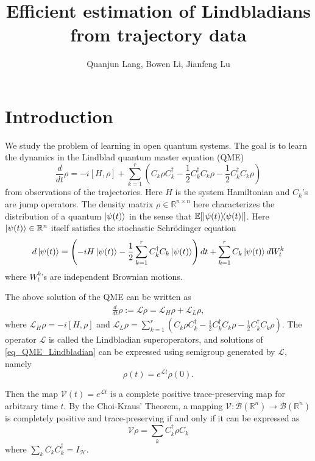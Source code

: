 \documentclass[10pt]{article}  %
\title{Efficient estimation of Lindbladians from trajectory data}
\author{Quanjun Lang, Bowen Li, Jianfeng Lu}
\date{}
\theoremstyle{plain}
\numberwithin{equation}{section}
\def\mH{\mathcal{H}}
\def\mL{\mathcal{L}}
\def\mV{\mathcal{V}}
\def\mB{\mathcal{B}}
\def\R{\mathbb{R}}
\begin{document}
\maketitle

\tableofcontents
\section{Introduction}

We study the problem of learning in open quantum systems. The goal is to learn the dynamics in the Lindblad quantum master equation (QME)
\begin{equation}\label{eq_QME_main}
	\frac{d}{dt} \rho = -i[H, \rho] + \sum_{k = 1}^r (C_k \rho C_k^\dagger - \frac{1}{2} C_k^\dagger C_k \rho - \frac{1}{2} C_k^\dagger C_k \rho)
\end{equation}
from observations of the trajectories. Here $H$ is the system Hamiltonian and $C_k$'s are jump operators. The density matrix $\rho \in \R^{n \times n}$ here characterizes the distribution of a quantum $\ket{\psi(t)}$ in the sense that $\mathbb{E}[\ketbra{\psi(t)}{\psi(t)}]$. 
Here $\ket{\psi(t)} \in \R^n$ itself satisfies the stochastic Schr\"{o}dinger equation
\begin{equation}
	d \ket{\psi(t)} = \left( -i H \ket{\psi(t)} - \frac{1}{2}\sum_{k = 1}^r C_k^\dagger C_k \ket{\psi(t)}\right) dt + \sum_{k = 1}^r C_k \ket{\psi(t)} dW^k_t
\end{equation}
where $W^k_t$'s are independent Brownian motions.


The above solution of the QME can be written as
\begin{align}\label{eq_QME_Lindbladian}
	\frac{d}{dt} \rho := \mL \rho =  \mL_H\rho + \mL_L \rho, 
\end{align}
where $\mL_H \rho = -i[H, \rho]$ and $\mL_L \rho = \sum_{k = 1}^r (C_k \rho C_k^\dagger - \frac{1}{2} C_k^\dagger C_k \rho - \frac{1}{2} C_k^\dagger C_k \rho)$. The operator $\mL$ is called the Lindbladian superoperators, and solutions of \eqref{eq_QME_Lindbladian} can be expressed using semigroup generated by $\mL$, namely
\begin{equation}
	\rho(t) = e^{\mL t}\rho(0).
\end{equation}

Then the map $\mV(t) = e^{\mL t}$ is a complete positive trace-preserving map for arbitrary time $t$. By the Choi-Kraus' Theorem, a mapping $\mV:\mB(\R^n) \to \mB(\R^n)$ is completely positive and trace-preserving if and only if it can be expressed as 
\begin{equation}
	\mV\rho = \sum_{k}C_k^\dagger \rho C_k
\end{equation}
where $\sum_{k}C_kC_k^\dagger = I_\mH$. 
\end{document}
